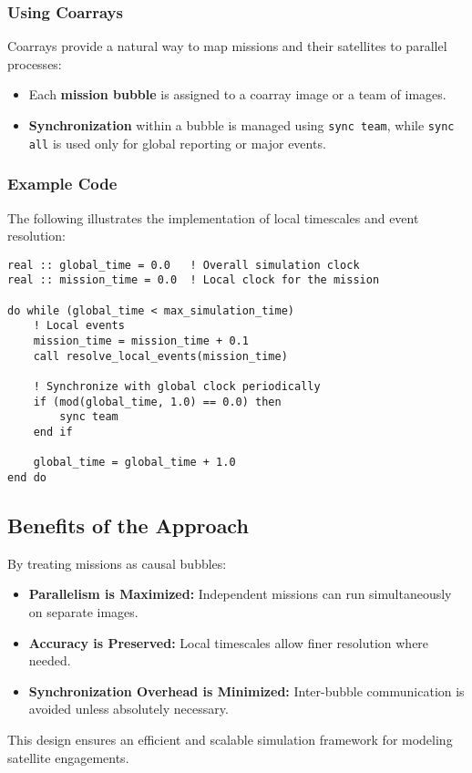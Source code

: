 \subsubsection{Using Coarrays}

Coarrays provide a natural way to map missions and their satellites to parallel processes:
\begin{itemize}
    \item Each \textbf{mission bubble} is assigned to a coarray image or a team of images.
    \item \textbf{Synchronization} within a bubble is managed using \texttt{sync team}, while \texttt{sync all} is used only for global reporting or major events.
\end{itemize}

\subsubsection{Example Code}

The following illustrates the implementation of local timescales and event resolution:
\begin{verbatim}
real :: global_time = 0.0   ! Overall simulation clock
real :: mission_time = 0.0  ! Local clock for the mission

do while (global_time < max_simulation_time)
    ! Local events
    mission_time = mission_time + 0.1
    call resolve_local_events(mission_time)

    ! Synchronize with global clock periodically
    if (mod(global_time, 1.0) == 0.0) then
        sync team
    end if

    global_time = global_time + 1.0
end do
\end{verbatim}

\subsection{Benefits of the Approach}

By treating missions as causal bubbles:
\begin{itemize}
    \item \textbf{Parallelism is Maximized:} Independent missions can run simultaneously on separate images.
    \item \textbf{Accuracy is Preserved:} Local timescales allow finer resolution where needed.
    \item \textbf{Synchronization Overhead is Minimized:} Inter-bubble communication is avoided unless absolutely necessary.
\end{itemize}

This design ensures an efficient and scalable simulation framework for modeling satellite engagements.
